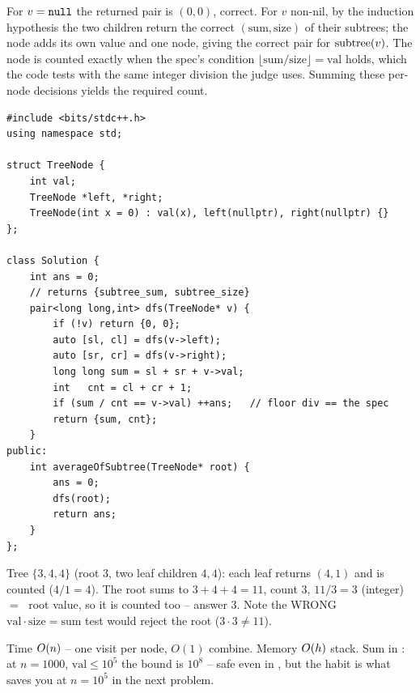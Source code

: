 \begin{proofbox}
For $v=\texttt{null}$ the returned pair is $(0,0)$, correct. For $v$ non-nil, by the induction
hypothesis the two children return the correct $(\mathrm{sum},\mathrm{size})$ of their
subtrees; the node adds its own value and one node, giving the correct pair for
$\operatorname{subtree}(v)$. The node is counted exactly when the spec's condition
$\lfloor\mathrm{sum}/\mathrm{size}\rfloor=\mathrm{val}$ holds, which the code tests with
the same integer division the judge uses. Summing these per-node decisions yields the
required count.
\end{proofbox}

\begin{lstlisting}[caption={Count Nodes Equal to Average (LeetCode 2265)}, label={lst:c01-count-avg}]
#include <bits/stdc++.h>
using namespace std;

struct TreeNode {
    int val;
    TreeNode *left, *right;
    TreeNode(int x = 0) : val(x), left(nullptr), right(nullptr) {}
};

class Solution {
    int ans = 0;
    // returns {subtree_sum, subtree_size}
    pair<long long,int> dfs(TreeNode* v) {
        if (!v) return {0, 0};
        auto [sl, cl] = dfs(v->left);
        auto [sr, cr] = dfs(v->right);
        long long sum = sl + sr + v->val;
        int   cnt = cl + cr + 1;
        if (sum / cnt == v->val) ++ans;   // floor div == the spec
        return {sum, cnt};
    }
public:
    int averageOfSubtree(TreeNode* root) {
        ans = 0;
        dfs(root);
        return ans;
    }
};
\end{lstlisting}

\begin{tracebox}
Tree $\{3,4,4\}$ (root $3$, two leaf children $4,4$): each leaf returns $(4,1)$ and is
counted ($4/1=4$). The root sums to $3+4+4=11$, count $3$, $11/3=3$ (integer) $=\;$
root value, so it is counted too -- answer $3$. Note the WRONG
$\mathrm{val}\cdot\mathrm{size}=\mathrm{sum}$ test would reject the root ($3\cdot3\ne11$).
\end{tracebox}

\begin{complexitybox}
Time $O(n)$ -- one visit per node, $O(1)$ combine. Memory $O(h)$ stack. Sum in
: at $n=1000$, $\mathrm{val}\le 10^5$ the bound is $10^8$ -- safe even
in , but the habit is what saves you at $n=10^5$ in the next problem.
\end{complexitybox}

